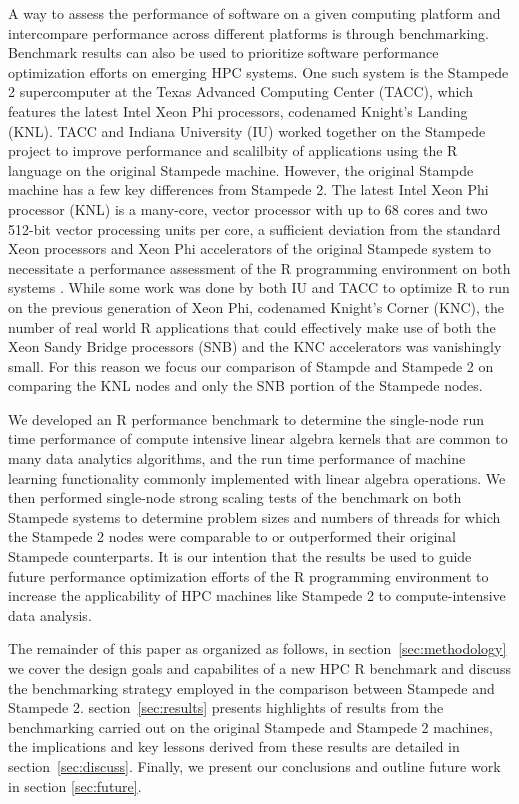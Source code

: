 A way to assess the performance of software on a given computing platform and intercompare
performance across different platforms is through benchmarking. Benchmark results can also
be used to prioritize software performance optimization efforts on emerging HPC systems.
One such system is the Stampede 2 supercomputer at the Texas Advanced Computing Center
(TACC), which features the latest Intel Xeon Phi processors, codenamed Knight's Landing
(KNL). TACC and  Indiana University (IU) worked together on the Stampede project to
improve performance and scalilbity of applications using the R language on the original
Stampede machine. However, the original Stampde machine has a few key differences from
Stampede 2. The latest Intel Xeon Phi processor (KNL) is a many-core, vector processor
with up to 68 cores and two 512-bit vector processing units per core, a sufficient
deviation from the standard Xeon processors and Xeon Phi accelerators of the original
Stampede system to necessitate a performance assessment of the R programming environment
on both systems \cite{tacc:stampedeGuide}. While some work was done by both IU and TACC to
optimize R to run on the previous generation of Xeon Phi, codenamed Knight's Corner (KNC),
the number of real world R applications that could effectively make use of both the Xeon
Sandy Bridge processors (SNB) and the KNC accelerators was vanishingly small. For this
reason we focus our comparison of Stampde and Stampede 2 on comparing the KNL nodes and
only the SNB portion of the Stampede nodes.

We developed an R performance benchmark to determine the single-node run time performance
of compute intensive linear algebra kernels that are common to many data analytics
algorithms, and the run time performance of machine learning functionality commonly
implemented with linear algebra operations.  We then performed single-node strong scaling
tests of the benchmark on both Stampede systems to determine problem sizes and numbers of
threads for which the Stampede 2 nodes were comparable to or outperformed their original
Stampede counterparts.  It is our intention that the results be used to guide future
performance optimization efforts of the R programming environment to increase the
applicability of HPC machines like Stampede 2 to compute-intensive data
analysis.

The remainder of this paper as organized as follows, in section~\ref{sec:methodology} we
cover the design goals and capabilites of a new HPC R benchmark and discuss the
benchmarking strategy employed in the comparison between Stampede and Stampede 2.
section~\ref{sec:results} presents highlights of results from the benchmarking carried out
on the original Stampede and Stampede 2 machines, the implications and key lessons derived
from these results are detailed in section~\ref{sec:discuss}. Finally, we present our
conclusions and outline future work in section \ref{sec:future}.

